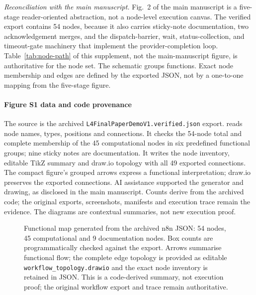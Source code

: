 \documentclass[journal]{IEEEtran}
\newif\ifshowrevisions
\newenvironment{revision}{\begingroup\ifshowrevisions\color{blue}\else\color{black}\fi}{\endgroup}
\newcommand{\rev}[1]{{\ifshowrevisions\color{blue}\else\color{black}\fi #1}}
\newcommand{\artifactpath}[1]{\path{#1}}
\begin{document}
\begin{revision}
\emph{Reconciliation with the main manuscript.} Fig.~2 of the main manuscript
is a five-stage reader-oriented abstraction, not a node-level execution canvas. The verified export contains 54 nodes, because it also
carries sticky-note documentation, two acknowledgement merges, and the
dispatch-barrier, wait, status-collection, and timeout-gate machinery that
implement the provider-completion loop. Table~\ref{tab:node-path} of this
supplement, not the main-manuscript figure, is authoritative for the node set.
The schematic groups functions. Exact node membership and edges are defined by the exported JSON, not by a one-to-one mapping from the five-stage figure.

\paragraph{Figure S1 data and code provenance}
The source is the archived \texttt{L4FinalPaperDemoV1.verified.json} export.
\artifactpath{scripts/l4/tnsm_revision/build_workflow_map.py} reads node
names, types, positions and connections. It checks the 54-node total and complete
membership of the 45 computational nodes in six predefined functional groups;
nine sticky notes are documentation. It writes the node inventory, editable
TikZ summary and draw.io topology with all 49 exported connections. The compact
figure's grouped arrows express a functional interpretation; draw.io preserves
the exported connections. AI assistance supported the generator and drawing,
as disclosed in the main manuscript. Counts derive from the archived code;
the original exports, screenshots, manifests and execution trace remain the
evidence. The diagrams are contextual summaries, not new execution proof.

\end{revision}
\begin{figure}[!t]
\centering
\resizebox{0.94\textwidth}{!}{}
\caption{\rev{Functional map generated from the archived n8n JSON: 54 nodes,
45 computational and 9 documentation nodes. Box counts are programmatically
checked against the export. Arrows summarise functional flow; the complete
edge topology is provided as editable \texttt{workflow\_topology.drawio} and
the exact node inventory is retained in JSON. This is a code-derived summary,
not execution proof; the original workflow export and trace remain authoritative.}}
\label{fig:supp-full-workflow}
\end{figure}
\end{document}
